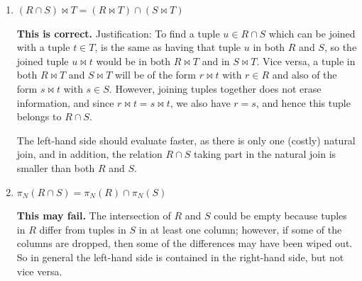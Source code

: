 \begin{enumerate}
    \item[a.] \((R \cap S) \bowtie T = (R \bowtie T) \cap (S \bowtie T)\)

    \textbf{This is correct.} Justification: To find a tuple \(u \in R \cap S\) which can be joined with a tuple \(t \in T\), is the same as having that tuple \(u\) in both \(R\) and \(S\), so the joined tuple \(u \bowtie t\) would be in both \(R \bowtie T\) and in \(S \bowtie T\). Vice versa, a tuple in both \(R \bowtie T\) and \(S \bowtie T\) will be of the form \(r \bowtie t\) with \(r \in R\) and also of the form \(s \bowtie t\) with \(s \in S\). However, joining tuples together does not erase information, and since \(r \bowtie t = s \bowtie t\), we also have \(r = s\), and hence this tuple belongs to \(R \cap S\).

    The left-hand side should evaluate faster, as there is only one (costly) natural join, and in addition, the relation \(R \cap S\) taking part in the natural join is smaller than both \(R\) and \(S\).

    \item[b.] \(\pi_N (R \cap S) = \pi_N (R) \cap \pi_N (S)\)

    \textbf{This may fail.} The intersection of \(R\) and \(S\) could be empty because tuples in \(R\) differ from tuples in \(S\) in at least one column; however, if some of the columns are dropped, then some of the differences may have been wiped out. So in general the left-hand side is contained in the right-hand side, but not vice versa.
\end{enumerate}

